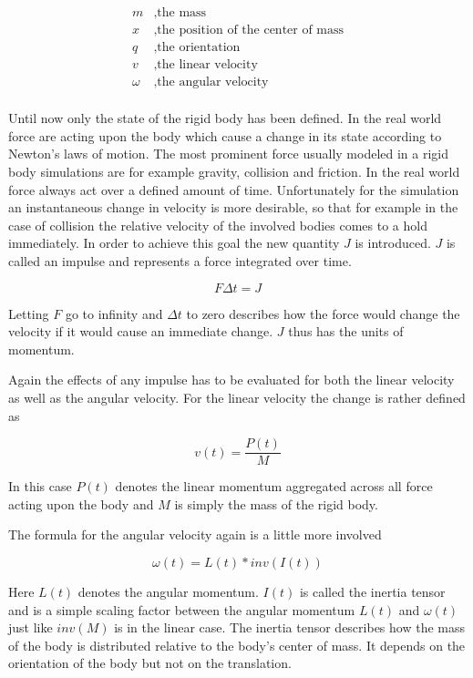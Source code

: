 \begin{align*}
m &, \text{the mass} \\
x &, \text{the position of the center of mass} \\
q &, \text{the orientation} \\
v &, \text{the linear velocity} \\
\omega &, \text{the angular velocity} \\
\end{align*}

Until now only the state of the rigid body has been defined. In the real world force are acting upon the body which cause a change in its state according to Newton's laws of motion. The most prominent force usually modeled in a rigid body simulations are for example gravity, collision and friction. In the real world force always act over a defined amount of time. Unfortunately for the simulation an instantaneous change in velocity is more desirable, so that for example in the case of collision the relative velocity of the involved bodies comes to a hold immediately. In order to achieve this goal the new quantity $J$ is introduced. $J$ is called an impulse and represents a force integrated over time.

\[
F \Delta t = J
\]

Letting $F$ go to infinity and $\Delta t$ to zero describes how the force would change the velocity if it would cause an immediate change. $J$ thus has the units of momentum. 

Again the effects of any impulse has to be evaluated for both the linear velocity as well as the angular velocity. For the linear velocity the change is rather defined as

\[
 v(t) = \frac{P(t)}{M}
\]

In this case $P(t)$ denotes the linear momentum aggregated across all force acting upon the body and $M$ is simply the mass of the rigid body.

The formula for the angular velocity again is a little more involved

\[
\omega(t) = L(t) * inv(I(t))
\]

Here $L(t)$ denotes the angular momentum. $I(t)$ is called the inertia tensor and is a simple scaling factor between the angular momentum $L(t)$ and $\omega(t)$ just like $inv(M)$ is in the linear case. The inertia tensor describes how the mass of the body is distributed relative to the body's center of mass. It depends on the orientation of the body but not on the translation.

